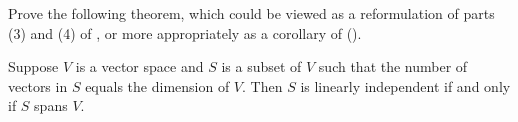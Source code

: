 Prove the following theorem, which could be viewed as a reformulation of parts (3) and (4) of , or more appropriately as a corollary of  ().\par
%
Suppose $V$ is a vector space and $S$ is a subset of $V$ such that the number of vectors in $S$ equals the dimension of $V$.  Then $S$ is linearly independent if and only if $S$ spans $V$.